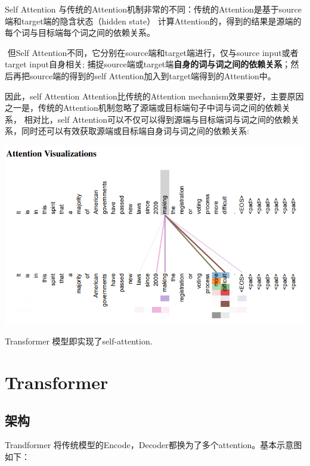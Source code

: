 \documentclass[UTF8,a4paper,10pt]{ctexart}
\begin{document}
   Self Attention 与传统的Attention机制非常的不同：传统的Attention是基于source端和target端的隐含状态（hidden state）
   计算Attention的，得到的结果是源端的每个词与目标端每个词之间的依赖关系。

​    但Self Attention不同，它分别在source端和target端进行，仅与source input或者target input自身相关;
捕捉source端或target端\textbf{自身的词与词之间的依赖关系}；然后再把source端的得到的self Attention加入到target端得到的Attention中。

    因此，self Attention Attention比传统的Attention mechanism效果要好，主要原因之一是，传统的Attention机制忽略了源端或目标端句子中词与词之间的依赖关系，
相对比，self Attention可以不仅可以得到源端与目标端词与词之间的依赖关系，同时还可以有效获取源端或目标端自身词与词之间的依赖关系:

\includegraphics[scale=0.7]{pics/190413-att.png}

Transformer 模型即实现了self-attention.

\section{Transformer}

\subsection{架构}

Trandformer 将传统模型的Encode，Decoder都换为了多个attention。基本示意图如下：
\end{document}
